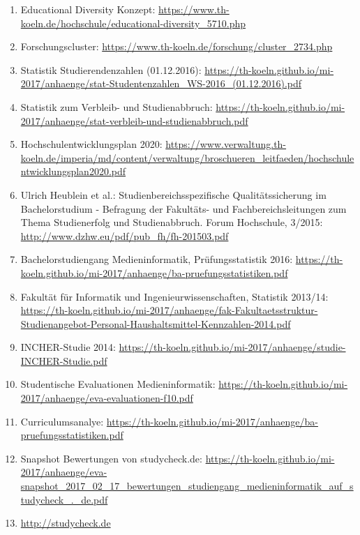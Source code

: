 \documentclass[BCOR12mm,DIV11,titlepage,a4paper,oneside,10pt]{scrbook}
\begin{document}
\begin{sloppypar}
\begin{flushleft}

\begin{enumerate}
\item{Educational Diversity Konzept: \url{https://www.th-koeln.de/hochschule/educational-diversity\_5710.php} } 
\item{Forschungscluster: \url{https://www.th-koeln.de/forschung/cluster\_2734.php} } 
\item{Statistik Studierendenzahlen (01.12.2016): \url{https://th-koeln.github.io/mi-2017/anhaenge/stat-Studentenzahlen\_WS-2016\_(01.12.2016).pdf} } 
\item{Statistik zum Verbleib- und Studienabbruch: \url{https://th-koeln.github.io/mi-2017/anhaenge/stat-verbleib-und-studienabbruch.pdf} } 
\item{Hochschulentwicklungsplan 2020: \url{https://www.verwaltung.th-koeln.de/imperia/md/content/verwaltung/broschueren\_leitfaeden/hochschulentwicklungsplan2020.pdf} } 
\item{Ulrich Heublein et al.: Studienbereichsspezifische Qualitätssicherung im Bachelorstudium - Befragung der Fakultäts- und Fachbereichsleitungen zum Thema Studienerfolg und Studienabbruch. Forum Hochschule, 3/2015: \url{http://www.dzhw.eu/pdf/pub\_fh/fh-201503.pdf} } 
\item{Bachelorstudiengang Medieninformatik, Prüfungsstatistik 2016: \url{https://th-koeln.github.io/mi-2017/anhaenge/ba-pruefungsstatistiken.pdf} } 
\item{Fakultät für Informatik und Ingenieurwissenschaften, Statistik 2013/14: \url{https://th-koeln.github.io/mi-2017/anhaenge/fak-Fakultaetsstruktur-Studienangebot-Personal-Haushaltsmittel-Kennzahlen-2014.pdf} } 
\item{INCHER-Studie 2014: \url{https://th-koeln.github.io/mi-2017/anhaenge/studie-INCHER-Studie.pdf} } 
\item{Studentische Evaluationen Medieninformatik: \url{https://th-koeln.github.io/mi-2017/anhaenge/eva-evaluationen-f10.pdf} } 
\item{Curriculumsanalye: \url{https://th-koeln.github.io/mi-2017/anhaenge/ba-pruefungsstatistiken.pdf} } 
\item{Snapshot Bewertungen von studycheck.de: \url{https://th-koeln.github.io/mi-2017/anhaenge/eva-snapshot\_2017\_02\_17\_bewertungen\_studiengang\_medieninformatik\_auf\_studycheck\_.\_de.pdf} } 
\item{\url{http://studycheck.de}} 

\end{enumerate}
\end{flushleft}
\end{sloppypar}
\end{document}

